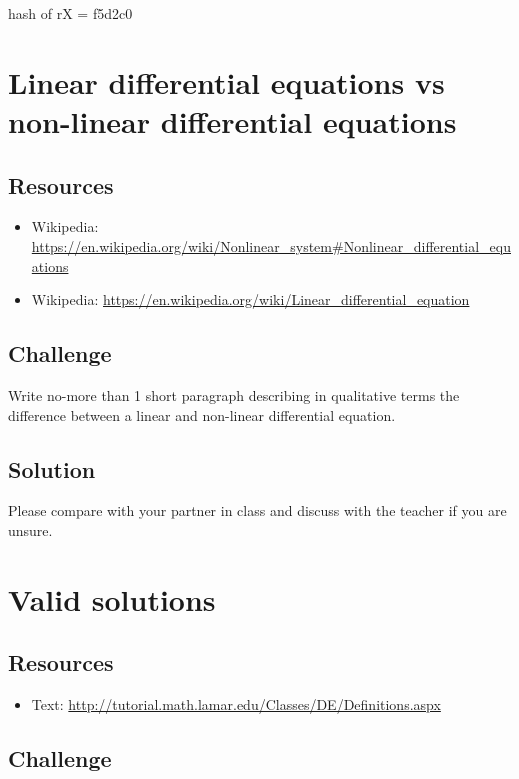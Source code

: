 hash of rX = f5d2c0




\newpage
\section{Linear differential equations vs non-linear differential equations}

\subsection*{Resources}
\begin{itemize}
    \item Wikipedia: \url{https://en.wikipedia.org/wiki/Nonlinear_system#Nonlinear_differential_equations}
    \item Wikipedia: \url{https://en.wikipedia.org/wiki/Linear_differential_equation}
\end{itemize}

\subsection*{Challenge}
Write no-more than 1 short paragraph describing in qualitative terms the difference between a linear and non-linear differential equation.

\subsection*{Solution}
Please compare with your partner in class and discuss with the teacher if you are unsure.




\newpage

\section{Valid solutions}

\subsection*{Resources}
\begin{itemize}
    \item Text: \url{http://tutorial.math.lamar.edu/Classes/DE/Definitions.aspx}
\end{itemize}

\subsection*{Challenge}


